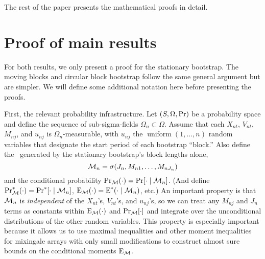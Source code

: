 \documentclass[11pt]{article}
\begin{document}
The rest of the paper presents the mathematical proofs in detail.

\appendix
\section{Proof of main results}

For both results, we only present a proof for the stationary
bootstrap. The moving blocks and circular block bootstrap follow the
same general argument but are simpler. We will define some additional
notation here before presenting the proofs.

First, the relevant probability infrastructure.  Let
$(S, \Omega, \operatorname{Pr})$ be a probability space and define the sequence of
sub-sigma-fields $\Omega_n \subset \Omega$. Assume that each
$X_{nt}$, $V_{nt}$, $M_{nj}$, and $u_{nj}$ is $\Omega_n$-measurable,
with $u_{nj}$ the $\operatorname{uniform}(1,\dots,n)$ random variables
that designate the start period of each bootstrap ``block.'' Also
define the \sigmafield\ generated by the stationary bootstrap's block
lengths alone,
\begin{equation}
  \mathcal{M}_n = \sigma(J_{n}, M_{n1},\dots,M_{nJ_n})
\end{equation}
and the conditional probability $\operatorname{Pr}_{\mathcal{M}}(\cdot) = \operatorname{Pr}[\cdot \mid \mathcal{M}_n]$.
(And define $\operatorname{Pr}_{\mathcal{M}}^*(\cdot) = \operatorname{Pr}^*[\cdot \mid \mathcal{M}_n]$, $\operatorname{E}_{\mathcal{M}}(\cdot) =
\operatorname{E}^*(\cdot \mid \mathcal{M}_n)$, etc.) An important property is
that $\mathcal{M}_n$ is \emph{independent} of the $X_{nt}$'s, $V_{nt}$'s, and
$u_{nj}$'s, so we can treat any
$M_{nj}$ and $J_n$ terms as constants within $\operatorname{E}_{\mathcal{M}}(\cdot)$ and
$\operatorname{Pr}_{\mathcal{M}}[\cdot]$ and integrate over the unconditional distributions of the
other random variables. This property is especially important because it allows us
to use maximal inequalities and other moment inequalities for
mixingale arrays with only small modifications to construct almost sure bounds on the
conditional moments $\operatorname{E}_{\mathcal{M}}$.
\end{document}
